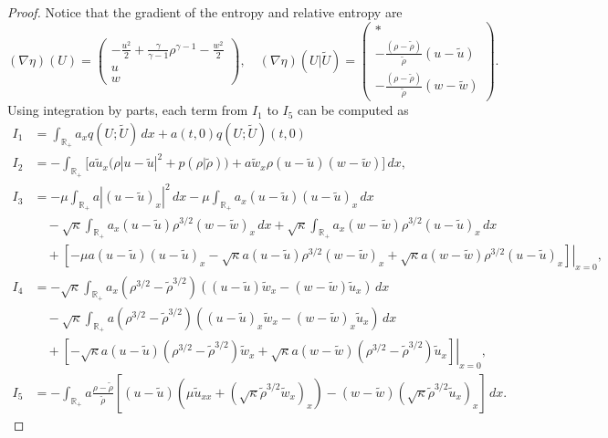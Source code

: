 \documentclass[11pt,reqno]{amsart}
\numberwithin{equation}{section} %
\begin{document}
\begin{proof}
    Notice that the gradient of the entropy and relative entropy are
    \[(\nabla\eta)(U) = \begin{pmatrix}
    -\frac{u^2}{2}+\frac{\gamma}{\gamma-1}\rho^{\gamma-1}-\frac{w^2}{2}\\u\\w
    \end{pmatrix}, \quad 
    (\nabla\eta)(U|\tilde{U}) = \begin{pmatrix}
    *\\-\frac{(\rho-\tilde{\rho})}{\tilde{\rho}}(u-\tilde{u})\\-\frac{(\rho-\tilde{\rho})}{\tilde{\rho}}(w-\tilde{w})
    \end{pmatrix}.\]
    Using integration by parts, each term from $I_1$ to $I_5$ can be computed as
    \begin{align*}
        I_1 &= \int_{\mathbb{R}_+}a_xq(U;\tilde{U})\,dx +a(t,0)q(U;\tilde{U})(t,0)\\
        I_2 &= -\int_{\mathbb{R}_+} \Big[ a\tilde{u}_x \bigl(\rho|u-\tilde{u}|^2+p(\rho|\tilde{\rho}) \bigr)+a\tilde{w}_x\rho(u-\tilde{u})(w-\tilde{w}) \Big]\,dx,\\
        I_3 &=-\mu \int_{\mathbb{R}_+}a|(u-\tilde{u})_x|^2\,dx -\mu\int_{\mathbb{R}_+}a_x(u-\tilde{u})(u-\tilde{u})_x\,dx\\
        &\quad -\sqrt{\kappa}\int_{\mathbb{R}_+}a_x(u-\tilde{u})\rho^{3/2}(w-\tilde{w})_x\,dx+\sqrt{\kappa}\int_{\mathbb{R}_+}a_x(w-\tilde{w})\rho^{3/2}(u-\tilde{u})_x\,dx\\
        &\quad + \left. \left[ -\mu a(u-\tilde{u})(u-\tilde{u})_x-\sqrt{\kappa}a(u-\tilde{u})\rho^{3/2}(w-\tilde{w})_x +\sqrt{\kappa}a(w-\tilde{w})\rho^{3/2}(u-\tilde{u})_x \right] \right|_{x=0},\\
        I_4 &=-\sqrt{\kappa}\int_{\mathbb{R}_+}a_x(\rho^{3/2}-\tilde{\rho}^{3/2})((u-\tilde{u})\tilde{w}_x-(w-\tilde{w})\tilde{u}_x)\,dx\\
        &\quad -\sqrt{\kappa}\int_{\mathbb{R}_+}a(\rho^{3/2}-\tilde{\rho}^{3/2})\left((u-\tilde{u})_x\tilde{w}_x-(w-\tilde{w})_x\tilde{u}_x\right)\,dx\\
        &\quad + \left. \left[-\sqrt{\kappa}a(u-\tilde{u})(\rho^{3/2}-\tilde{\rho}^{3/2})\tilde{w}_x +\sqrt{\kappa}a(w-\tilde{w})(\rho^{3/2}-\tilde{\rho}^{3/2})\tilde{u}_x \right] \right|_{x=0}, \\
        I_5 &= -\int_{\mathbb{R}_+}a\frac{\rho-\tilde{\rho}}{\tilde{\rho}}\left[(u-\tilde{u})\left(\mu \tilde{u}_{xx}+(\sqrt{\kappa}\tilde{\rho}^{3/2}\tilde{w}_x)_x\right)-(w-\tilde{w})(\sqrt{\kappa}\tilde{\rho}^{3/2}\tilde{u}_x)_x\right]\,dx.
    \end{align*}
    

\end{proof}
\end{document}
